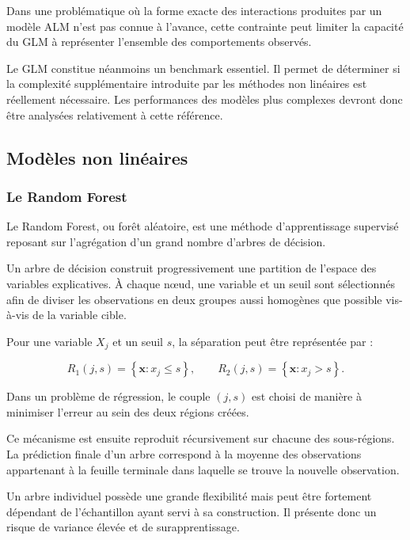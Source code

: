 Dans une problématique où la forme exacte des interactions produites par un modèle ALM n'est pas connue à l'avance, cette contrainte peut limiter la capacité du GLM à représenter l'ensemble des comportements observés.

Le GLM constitue néanmoins un benchmark essentiel. Il permet de déterminer si la complexité supplémentaire introduite par les méthodes non linéaires est réellement nécessaire. Les performances des modèles plus complexes devront donc être analysées relativement à cette référence.


\subsection{Modèles non linéaires}

\subsubsection{Le Random Forest}

Le Random Forest, ou forêt aléatoire, est une méthode d'apprentissage supervisé reposant sur l'agrégation d'un grand nombre d'arbres de décision.

Un arbre de décision construit progressivement une partition de l'espace des variables explicatives. À chaque nœud, une variable et un seuil sont sélectionnés afin de diviser les observations en deux groupes aussi homogènes que possible vis-à-vis de la variable cible.

Pour une variable $X_j$ et un seuil $s$, la séparation peut être représentée par :

\begin{equation}
    R_1(j,s)
    =
    \left\{
    \mathbf{x}:x_j \leq s
    \right\},
    \qquad
    R_2(j,s)
    =
    \left\{
    \mathbf{x}:x_j > s
    \right\}.
\end{equation}

Dans un problème de régression, le couple $(j,s)$ est choisi de manière à minimiser l'erreur au sein des deux régions créées.

Ce mécanisme est ensuite reproduit récursivement sur chacune des sous-régions. La prédiction finale d'un arbre correspond à la moyenne des observations appartenant à la feuille terminale dans laquelle se trouve la nouvelle observation.

Un arbre individuel possède une grande flexibilité mais peut être fortement dépendant de l'échantillon ayant servi à sa construction. Il présente donc un risque de variance élevée et de surapprentissage.

